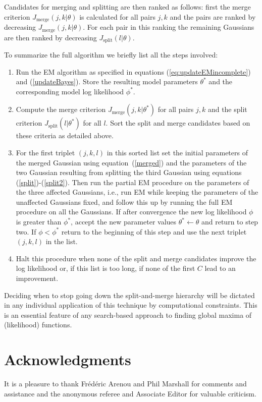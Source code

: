 \documentclass[aoas,preprint,authoryear,round]{imsart}
\newcommand{\eqnnumber}{equation}
\newcommand{\ie}{i.e.}
\begin{document}
Candidates for merging and splitting are then ranked as follows: first
the merge criterion $J_{\mbox{merge}}(j,k|\theta)$ is calculated for
all pairs $j,k$ and the pairs are ranked by decreasing
$J_{\mbox{merge}}(j,k|\theta)$. For each pair in this ranking the
remaining Gaussians are then ranked by decreasing
$J_{\mbox{split}}(l|\theta)$.


To summarize the full algorithm we briefly list all the steps
involved:
\begin{enumerate}
\item Run the EM algorithm as specified in \eqnnumber s
(\ref{eq:updateEMincomplete}) and (\ref{updateBayes}). Store the
resulting model parameters $\theta^*$ and the corresponding model log
likelihood $\phi^*$.
\item Compute the merge criterion $J_{\mbox{merge}}(j,k|\theta^*)$ for
all pairs $j,k$ and the split criterion $J_{\mbox{split}}(l|\theta^*)$
for all $l$. Sort the split and merge candidates based on these
criteria as detailed above.
\item For the first triplet $(j,k,l)$ in this sorted list set the
initial parameters of the merged Gaussian using \eqnnumber\ (\ref{merged}) and the
parameters of the two Gaussian resulting from splitting the third
Gaussian using \eqnnumber s (\ref{split})-(\ref{split2}). Then run the
partial EM procedure on the parameters of the three affected
Gaussians, \ie, run EM while keeping the parameters of the unaffected
Gaussians fixed, and follow this up by running the full EM procedure
on all the Gaussians. If after convergence the new log likelihood
$\phi$ is greater than $\phi^*$, accept the new parameter values
$\theta^* \leftarrow \theta$ and return to step two. If $\phi <
\phi^*$ return to the beginning of this step and use the next triplet
$(j,k,l)$ in the list.
\item Halt this procedure when none of the split and merge candidates
improve the log likelihood or, if this list is too long, if none of
the first $C$ lead to an improvement.
\end{enumerate}

Deciding when to stop going down the split-and-merge hierarchy will be
dictated in any individual application of this technique by
computational constraints. This is an essential feature of any
search-based approach to finding global maxima of (likelihood)
functions.



\section*{Acknowledgments}
It is a pleasure to thank Fr{\'e}d{\'e}ric Arenou and Phil Marshall
for comments and assistance and the anonymous referee and Associate
Editor for valuable criticism.
\end{document}
